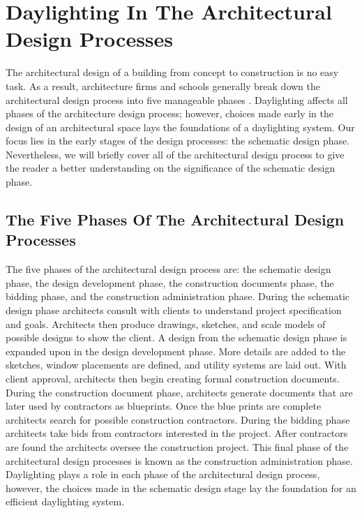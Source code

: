 \section{Daylighting In The Architectural Design Processes}

The architectural design of a building from concept to construction is no easy task.
As a result, architecture firms and schools generally break down the architectural design process into five manageable phases \cite{bazjanac1974architectural}.  %
Daylighting affects all phases of the architecture design process; however, choices made early in the design of an architectural space lays the foundations of a daylighting system.
Our focus lies in the early stages of the design processes: the schematic design phase.
Nevertheless, we will briefly cover all of the architectural design process to give the reader a better understanding on the significance of the schematic design phase.\\

\subsection{The Five Phases Of The Architectural Design Processes} 
The five phases of the architectural design process are: the schematic design phase, the design development phase, the construction documents phase, the bidding phase, and the construction administration phase.
During the schematic design phase architects consult with clients to understand project specification and goals. Architects then produce drawings, sketches, and scale models of possible designs to show the client.
A design from the schematic design phase is expanded upon in the design development phase.
More details are added to the sketches, window placements are defined, and utility systems are laid out.
With client approval, architects then begin creating formal construction documents. During the construction document phase, architects generate documents that are later used by contractors as blueprints.
Once the blue prints are complete architects search for possible construction contractors.
During the bidding phase architects take bids from contractors interested in the project.
After contractors are found the architects oversee the construction project.
This final phase of the architectural design processes is known as the construction administration phase.
Daylighting plays a role in each phase of the architectural design process, however, the choices made in the schematic design stage lay the foundation for an efficient daylighting system.\\

